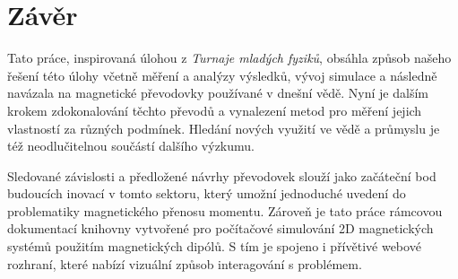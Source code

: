 \chapter{Závěr}

Tato práce, inspirovaná úlohou z \textit{Turnaje mladých fyziků}, obsáhla způsob našeho řešení této úlohy včetně měření a analýzy výsledků, vývoj simulace a následně navázala na magnetické převodovky používané v dnešní vědě. Nyní je dalším krokem zdokonalování těchto převodů a vynalezení metod pro měření jejich vlastností za různých podmínek. Hledání nových využití ve vědě a průmyslu je též neodlučitelnou součástí dalšího výzkumu.

Sledované závislosti a předložené návrhy převodovek slouží jako začáteční bod budoucích inovací v tomto sektoru, který umožní jednoduché uvedení do problematiky magnetického přenosu momentu. Zároveň je tato práce rámcovou dokumentací knihovny vytvořené pro počítačové simulování 2D magnetických systémů použitím magnetických dipólů. S tím je spojeno i přívětivé webové rozhraní, které nabízí vizuální způsob interagování s problémem.
